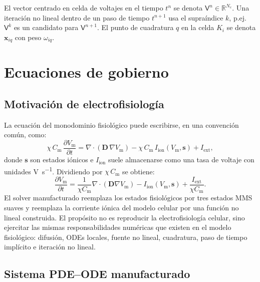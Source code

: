 \documentclass[11pt,a4paper]{article}
\newcommand{\Vm}{V_{\text{m}}}
\newcommand{\Iion}{I_{\mathrm{ion}}}
\newcommand{\Dten}{\mathbf{D}}
\newcommand{\grad}{\nabla}
\newcommand{\divg}{\nabla\!\cdot}
\newcommand{\R}{\mathbb{R}}
\begin{document}
El vector centrado en celda de voltajes en el tiempo $t^n$ se denota $\mathsf{V}^n\in\R^{N_c}$.
Una iteración no lineal dentro de un paso de tiempo $t^{n+1}$ usa el supraíndice $k$, p.ej.\
$\mathsf{V}^k$ es un candidato para $\mathsf{V}^{n+1}$. El punto de cuadratura $q$ en la celda
$K_i$ se denota $\mathbf{x}_{iq}$ con peso $\omega_{iq}$.

\section{Ecuaciones de gobierno}

\subsection{Motivación de electrofisiología}

La ecuación del monodominio fisiológico puede escribirse, en una convención común, como:
%
\begin{equation}
  \chi \, C_{\text{m}} \, \frac{\partial \Vm}{\partial t}
  =
  \divg(\Dten\,\grad \Vm)
  - \chi \, C_{\text{m}} \, \Iion(\Vm,\mathbf{s})
  + I_{\mathrm{ext}},
  \label{eq:phys-monodomain}
\end{equation}
%
donde $\mathbf{s}$ son estados iónicos e $\Iion$ suele almacenarse como una tasa de voltaje
con unidades \si{\volt\per\second}. Dividiendo por $\chi \, C_{\text{m}}$ se obtiene:
%
\begin{equation}
  \frac{\partial \Vm}{\partial t}
  =
  \frac{1}{\chi C_{\text{m}}}\divg(\Dten\grad\Vm)
  - \Iion(\Vm,\mathbf{s})
  + \frac{I_{\mathrm{ext}}}{\chi C_{\text{m}}}.
\end{equation}
%
El solver manufacturado reemplaza los estados fisiológicos por tres estados MMS suaves y
reemplaza la corriente iónica del modelo celular por una función no lineal construida. El
propósito no es reproducir la electrofisiología celular, sino ejercitar las mismas
responsabilidades numéricas que existen en el modelo fisiológico: difusión, ODEs locales, fuente no lineal, cuadratura, paso de
tiempo implícito e iteración no lineal.

\subsection{Sistema PDE--ODE manufacturado}
\end{document}
